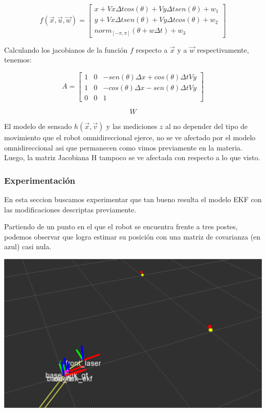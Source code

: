 $$f(\overrightarrow{x},\overrightarrow{u}, \overrightarrow{w})= \begin{bmatrix}
         x + Vx \Delta t cos(\theta) + Vy \Delta t sen(\theta) + w_1 \\
         y + Vx \Delta t sen(\theta) + Vy \Delta t cos(\theta) + w_2 \\
         norm_{[-\pi,\pi]} (\theta + w \Delta t) + w_3
         \end{bmatrix}$$

Calculando los jacobianos de la función $f$ respecto a $\overrightarrow{x}$ y a $\overrightarrow{w}$ respectivamente, tenemos:

$$A= \begin{bmatrix}
         1 & 0 & -sen(\theta)\Delta x + cos(\theta) \Delta t V y\\
         1 & 0 & -cos(\theta)\Delta x - sen(\theta) \Delta t V y \\
         0 & 0 & 1
         \end{bmatrix}$$

$$W$$

El modelo de sensado $h(\overrightarrow{x},\overrightarrow{v})$ y las mediciones $z$ al no depender del tipo de movimiento que el robot omnidireccional ejerce, no se ve afectado por el modelo omnidireccional asi que permanecen como vimos previamente en la materia. Luego, la matriz Jacobiana H tampoco se ve afectada con respecto a lo que visto.


\subsubsection{Experimentación}

En esta seccion buscamos experimentar que tan bueno resulta el modelo EKF con las modificaciones descriptas previamente.

Partiendo de un punto en el que el robot se encuentra frente a tres postes, podemos observar que logra estimar su posición con una matriz de covarianza (en azul) casi nula.

\includegraphics[scale=0.3]{punto4/ekfViendoTodosLosPostes.png}

